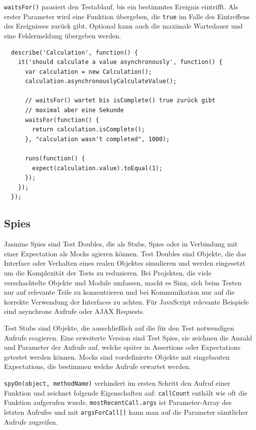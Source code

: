\documentclass[11pt, a4paper]{article}
\begin{document}
\clearpage

\texttt{waitsFor()} pausiert den Testablauf, bis ein bestimmtes Ereignis
eintrifft. Als erster Parameter wird eine Funktion übergeben, die \texttt{true}
im Falle des Eintreffens des Ereignisses zurück gibt. Optional kann auch die
maximale Wartedauer und eine Fehlermeldung übergeben werden.

\begin{verbatim}
  describe('Calculation', function() {
    it('should calculate a value asynchronously', function() {
      var calculation = new Calculation();
      calculation.asynchronouslyCalculateValue();

      // waitsFor() wartet bis isComplete() true zurück gibt
      // maximal aber eine Sekunde
      waitsFor(function() {
        return calculation.isComplete();
      }, "calculation wasn't completed", 1000);

      runs(function() {
        expect(calculation.value).toEqual(1);
      });
    });
  });
\end{verbatim}

\subsection{Spies}

Jasmine Spies sind Test Doubles\cite{meszaros_test_2011-1}, die als Stubs,
Spies oder in Verbindung mit einer Expectation als Mocks agieren können.
Test Doubles sind Objekte, die das Interface oder Verhalten eines realen
Objektes simulieren und werden eingesetzt um die Komplexität der Tests zu
reduzieren. Bei Projekten, die viele verschachtelte Objekte und Module umfassen,
macht es Sinn, sich beim Testen nur auf relevante Teile zu konzentrieren und bei
Kommunikation nur auf die korrekte Verwendung der Interfaces zu achten. Für
JavaScript relevante Beispiele sind asynchrone Aufrufe oder AJAX Requests.

Test Stubs sind Objekte, die ausschließlich auf die für den Test notwendigen
Aufrufe reagieren. Eine erweiterte Version sind Test Spies, sie zeichnen die
Anzahl und Parameter der Aufrufe auf, welche später in Assertions oder
Expectations getestet werden können. Mocks sind vordefinierte Objekte mit
eingebauten Expectations, die bestimmen welche Aufrufe erwartet werden.

\texttt{spyOn(object, methodName)} verhindert im ersten Schritt den Aufruf einer
Funktion und zeichnet folgende Eigenschaften auf: \texttt{callCount} enthält wie
oft die Funktion aufgerufen wurde, \texttt{mostRecentCall.args} ist
Parameter-Array des letzten Aufrufes und mit \texttt{argsForCall[]} kann man auf
die Parameter sämtlicher Aufrufe zugreifen.
\end{document}

